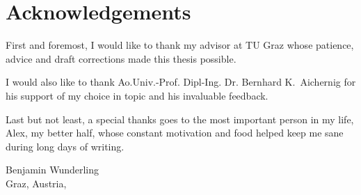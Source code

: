 %
%
%


\chapter*{Acknowledgements}

First and foremost, I would like to thank my advisor at TU Graz whose patience, advice and draft corrections made this thesis possible. 

I would also like to thank Ao.Univ.-Prof. Dipl-Ing. Dr. Bernhard K.~Aichernig for his support of my choice in topic and his invaluable feedback.

Last but not least, a special thanks goes to the most important person in my life, Alex, my better half, whose constant motivation and food helped keep me sane during long days of writing.


\vspace{2cm}


\begin{flushright}
Benjamin Wunderling \\[1ex]
{\small Graz, Austria, \thisdate}
\end{flushright}

